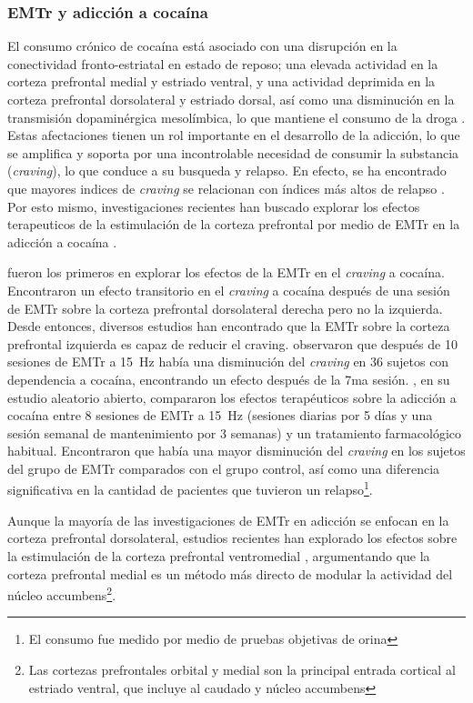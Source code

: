 \subsubsection{EMTr y adicción a cocaína}
El consumo crónico de cocaína está asociado con una disrupción en la conectividad fronto-estriatal en estado de reposo; una elevada actividad en la corteza prefrontal medial y estriado ventral, y una actividad deprimida en la corteza prefrontal dorsolateral y estriado dorsal, así como una disminución en la transmisión dopaminérgica mesolímbica, lo que mantiene el consumo de la droga \parencite{Rachid2018}.
Estas afectaciones tienen un rol importante en el desarrollo de la adicción, lo que se amplifica y soporta por una incontrolable necesidad de consumir la substancia (\textit{craving}), lo que conduce a su busqueda y relapso.
En efecto, se ha encontrado que mayores indices de \textit{craving} se relacionan con índices más altos de relapso \parencite{Sinha2006,Volkow2000a,Volkow2016}.
Por esto mismo, investigaciones recientes han buscado explorar los efectos terapeuticos de la estimulación de la corteza prefrontal  por medio de EMTr en la adicción a cocaína \parencite{Bolloni2018}. \par
\textcite{Camprodon2007} fueron los primeros en explorar los efectos de la EMTr en el \textit{craving} a cocaína.
Encontraron un efecto transitorio en el \textit{craving} a cocaína después de una sesión de EMTr sobre la corteza prefrontal dorsolateral derecha \textemdash{}pero no la izquierda.
Desde entonces, diversos estudios han encontrado que la EMTr sobre la corteza prefrontal izquierda es capaz de reducir el craving.
\textcite{Politi2008} observaron que después de 10 sesiones de EMTr a \SI{15}{\hertz} había una disminución del \textit{craving} en 36 sujetos con dependencia a cocaína, encontrando un efecto después de la 7ma sesión.
\textcite{Terraneo2016}, en su estudio aleatorio abierto, compararon los efectos terapéuticos sobre la adicción a cocaína entre 8 sesiones de EMTr a \SI{15}{\hertz} (sesiones diarias por 5 días y una sesión semanal de mantenimiento por 3 semanas) y un tratamiento farmacológico habitual.
Encontraron que había una mayor disminución del \textit{craving} en los sujetos del grupo de EMTr comparados con el grupo control, así como una diferencia significativa en la cantidad de pacientes que tuvieron un relapso\footnote{El consumo fue medido por medio de pruebas objetivas de orina}. \par
Aunque la mayoría de las investigaciones de EMTr en adicción se enfocan en la corteza prefrontal dorsolateral, estudios recientes han explorado los efectos sobre la estimulación de la corteza prefrontal ventromedial \parencite{Hanlon2015,Kearney-Ramos2018a}, argumentando que la corteza prefrontal medial es un método más directo de modular la actividad del núcleo accumbens\footnote{Las cortezas prefrontales orbital y medial son la principal entrada cortical al estriado ventral, que incluye al caudado y núcleo accumbens}.
